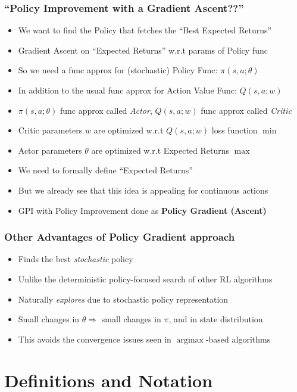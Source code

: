 \documentclass[handout]{beamer}
\DeclareMathOperator*{\argmax}{argmax}
\begin{document}
\begin{frame}
\frametitle{``Policy Improvement with a Gradient Ascent??''}
\pause
\begin{itemize}[<+->]
\item We want to find the Policy that fetches the ``Best Expected Returns''
\item Gradient Ascent on ``Expected Returns'' w.r.t params of Policy func
\item So we need a func approx for (stochastic) Policy Func: $\pi(s, a; \theta)$
\item In addition to the usual func approx for Action Value Func: $Q(s, a; w)$
\item $\pi(s, a; \theta)$ func approx called {\em Actor}, $Q(s, a; w)$ func approx called {\em Critic}
\item Critic parameters $w$ are optimized w.r.t $Q(s, a; w)$ loss function $\min$
\item Actor parameters $\theta$ are optimized w.r.t Expected Returns $\max$
\item We need to formally define ``Expected Returns''
\item But we already see that this idea is appealing for continuous actions
\item GPI with Policy Improvement done as {\bf Policy Gradient (Ascent)}
\end{itemize}
\end{frame}

\begin{frame}
\frametitle{Other Advantages of Policy Gradient approach}
\pause
\begin{itemize}[<+->]
\item Finds the best {\em stochastic} policy
\item Unlike the deterministic policy-focused search of other RL algorithms
\item Naturally {\em explores} due to stochastic policy representation
\item Small changes in $\theta \Rightarrow$ small changes in $\pi$, and in state distribution
\item This avoids the convergence issues seen in $\argmax$-based algorithms 
\end{itemize}
\end{frame}

\section{Definitions and Notation}
\end{document}

